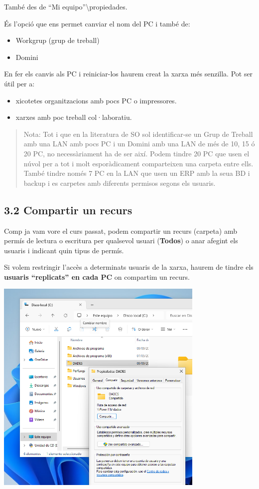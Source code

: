 \documentclass[
  a4paper,
]{article}
\providecommand{\tightlist}{%
  \setlength{\itemsep}{0pt}\setlength{\parskip}{0pt}}
\begin{document}
També des de ``Mi equipo''\textbackslash propiedades.

És l'opció que ens permet canviar el nom del PC i també de:

\begin{itemize}
\tightlist
\item
  Workgrup (grup de treball)
\item
  Domini
\end{itemize}

En fer els canvis als PC i reiniciar-los haurem creat la xarxa més
senzilla. Pot ser útil per a:

\begin{itemize}
\tightlist
\item
  xicotetes organitzacions amb pocs PC o impressores.
\item
  xarxes amb poc treball col·laboratiu.
\end{itemize}

\begin{quote}
Nota: Tot i que en la literatura de SO sol identificar-se un Grup de
Treball amb una LAN amb pocs PC i un Domini amb una LAN de més de 10, 15
ó 20 PC, no necessàriament ha de ser així. Podem tindre 20 PC que usen
el núvol per a tot i molt esporàdicament comparteixen una carpeta entre
ells. També tindre només 7 PC en la LAN que usen un ERP amb la seua BD i
backup i es carpetes amb diferents permisos segons els usuaris.
\end{quote}

\subsection{3.2 Compartir un recurs}\label{compartir-un-recurs}

Comp ja vam vore el curs passat, podem compartir un recurs (carpeta) amb
permís de lectura o escritura per qualsevol usuari (\textbf{Todos}) o
anar afegint els usuaris i indicant quin tipus de permís.

Si volem restringir l'accès a determinats usuaris de la xarxa, haurem de
tindre els \textbf{usuaris ``replicats'' en cada PC} on compartim un
recurs.

\includegraphics[width=0.75\textwidth,height=\textheight]{png/compartir1.png}
\end{document}
